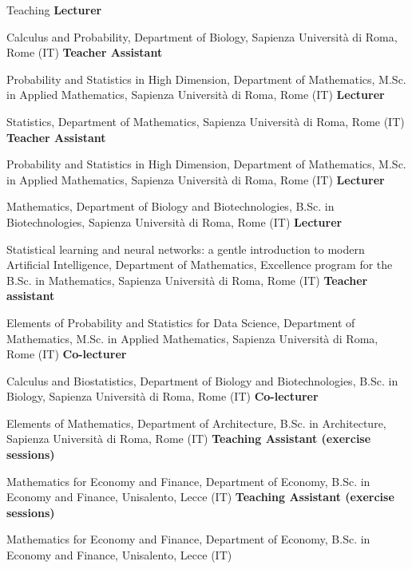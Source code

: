 \begin{rubric}{Teaching}
  \textbf{Lecturer}\par Calculus and Probability, Department of Biology, Sapienza Università di Roma, Rome (IT)
  \textbf{Teacher Assistant}\par Probability and Statistics in High Dimension, Department of Mathematics, M.Sc. in Applied Mathematics, Sapienza Università di Roma, Rome (IT)
  \textbf{Lecturer}\par Statistics, Department of Mathematics, Sapienza Università di Roma, Rome (IT)
  \textbf{Teacher Assistant}\par Probability and Statistics in High Dimension, Department of Mathematics, M.Sc. in Applied Mathematics, Sapienza Università di Roma, Rome (IT)
  \textbf{Lecturer}\par Mathematics, Department of Biology and Biotechnologies, B.Sc. in Biotechnologies, Sapienza Università di Roma, Rome (IT)
  \textbf{Lecturer}\par Statistical learning and neural networks: a gentle introduction to modern Artificial Intelligence, Department of Mathematics, Excellence program for the B.Sc. in Mathematics, Sapienza Università di Roma, Rome (IT)
  \textbf{Teacher assistant}\par Elements of Probability and Statistics for Data Science, Department of Mathematics, M.Sc. in Applied Mathematics, Sapienza Università di Roma, Rome (IT)
  \textbf{Co-lecturer}\par Calculus and Biostatistics, Department of Biology and Biotechnologies, B.Sc. in Biology, Sapienza Università di Roma, Rome (IT)
  \textbf{Co-lecturer}\par Elements of Mathematics, Department of Architecture, B.Sc. in Architecture, Sapienza Università di Roma, Rome (IT)
  \textbf{Teaching Assistant (exercise sessions)}\par Mathematics for Economy and Finance, Department of Economy, B.Sc. in Economy and Finance, Unisalento, Lecce (IT)
  \textbf{Teaching Assistant (exercise sessions)}\par Mathematics for Economy and Finance, Department of Economy, B.Sc. in Economy and Finance, Unisalento, Lecce (IT)
\end{rubric}
